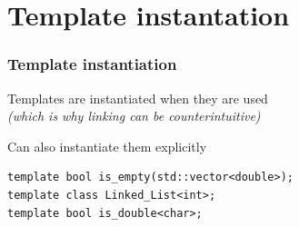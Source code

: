 \documentclass[14pt]{beamer}
\begin{document}
\section{Template instantation}
\frame{\sectionpage}

\begin{frame}[fragile]
  \frametitle{Template instantiation}

  Templates are instantiated when they are used\\
  {\itshape\changefontsize{10pt}(which is why linking can be counterintuitive)}

  \vspace{.75cm}

  Can also instantiate them explicitly

  \vspace{.25cm}

  \begin{lstlisting}[basicstyle=\codefontsize{10pt}]
template bool is_empty(std::vector<double>);
template class Linked_List<int>;
template bool is_double<char>;
  \end{lstlisting}

\end{frame}
\end{document}
